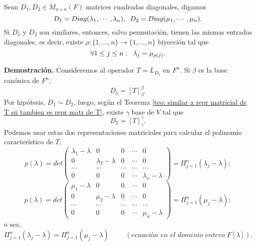 \begin{cor}
	Sean $D_{1}, D_{2} \in M_{n \times n}(F)$ matrices cuadradas diagonales, digamos
	\[
	D_{1} = Diag(\lambda_{1}, \cdots , \lambda_{n}), \hspace{0.2cm}
	D_{2} = Diag(\mu_{1}, \cdots , \mu_{n}).
	\]
	Si $D_{1}$ y $D_{2}$ son similares, entonces, salvo permutación, tienen
	las mismas entradas diagonales, es decir, existe
	$\rho : \{1, \ldots , n\} \longrightarrow \{1, \ldots , n\}$
	biyección tal que 
	\[
	\forall 1 \leq j \leq n: \hspace{0.2cm} \lambda_{j} = \mu_{\rho(j)}.
	\]
\end{cor}
\textbf{Demostración.}
Consideremos al operador
$T = L_{D_{1}}$ en $F^{n}$.
Si $\beta$ es la base canónica de $F^{n}$, 
\begin{equation}
	\label{eq: cor matrices similares diagonales, 1}
	D_{1} = [T]_{\beta}^{\beta}.
\end{equation}
Por hipótesis, 
$D_{1} \sim D_{2}$, luego, según el Teorema
\ref{teo: similar a repr matricial de T sii tambien es repr matr de T},
existe $\gamma$ base de $V$ tal que 
\begin{equation}
	\label{eq: cor matrices similares diagonales, 2}
	D_{2} = [T]_{\gamma}^{\gamma}.
\end{equation}
Podemos usar estas dos representaciones matriciales para calcular
el polinomio característico de $T$; 
\[
p(\lambda) = det \begin{pmatrix}
	\lambda_{1} - \lambda & 0 & 0 & \cdots & 0 \\
	0 & \lambda_{2} - \lambda &0 & \cdots & 0 \\
	\cdots & \cdots & \cdots & \cdots & \cdots \\
	0 & 0 & 0 & \cdots & \lambda_{n} - \lambda
\end{pmatrix} = \Pi_{j=1}^{n} (\lambda_{j} - \lambda);
\]
\[
p(\lambda) = det \begin{pmatrix}
	\mu_{1} - \lambda & 0 & 0 & \cdots & 0 \\
	0 & \mu_{2} - \lambda &0 & \cdots & 0 \\
	\cdots & \cdots & \cdots & \cdots & \cdots \\
	0 & 0 & 0 & \cdots & \mu_{n} - \lambda
\end{pmatrix} = \Pi_{j=1}^{n} (\mu_{j} - \lambda);
\]
o sea, 
\begin{equation}
	\label{eq: cor matrices similares diagonales, 3}
	\Pi_{j=1}^{n} (\lambda_{j} - \lambda) = 
	\Pi_{j=1}^{n} (\mu_{j} - \lambda) 
	\hspace{1cm} (\textit{ecuación en el dominio entero } F[\lambda]).
\end{equation}
